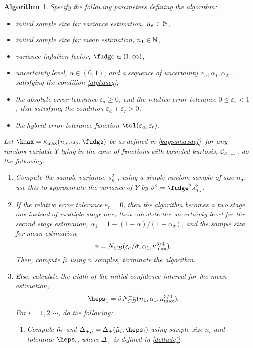 \documentclass{iitthesis}
\newtheorem{algorithm}[theorem]{Algorithm}
\begin{document}
\begin{algorithm}\label{meanMCg} 
Specify the following parameters defining the algorithm:
\begin{itemize}
\item initial sample size for variance estimation, $n_{\sigma} \in \mathbb{N}$,
\item initial sample size for mean estimation, $n_1 \in \mathbb{N}$,
\item variance inflation factor, $\fudge \in (1,\infty)$, 
\item uncertainty level, $\alpha\in (0,1)$, and a sequence of uncertainty $ \alpha_\sigma, \alpha_1,  \alpha_2, \ldots$ satisfying the condition \eqref{alphaseq}, 
\item the absolute error tolerance $\varepsilon_a \geq 0$, and the relative error tolerance $0 \leq \varepsilon_r <1$, that satisfying the condition $\varepsilon_a+\varepsilon_r >0$,
\item the hybrid error tolerance function $\tol(\varepsilon_a,\varepsilon_r)$.
\end{itemize} 
Let $\kmax=\kappa_{\max}(n_\sigma,\alpha_\sigma,\fudge)$ be as defined in \eqref{kappamaxdef}, for any random variable $Y$ lying in the cone of functions with bounded kurtosis, $\mathcal{C}_{\kappa_{\max}}$, do the following:
\begin{enumerate}
\item Compute the sample variance, $s^2_{n_{\sigma}}$, using a simple random sample of size $n_\sigma$, use this to approximate the variance of $Y$ by $\hsigma^2 = \fudge^2 s^2_{n_\sigma}$. 
\item If the relative error tolerance $\varepsilon_r=0$, then the algorithm becomes a two stage one instead of multiple stage one, then calculate the uncertainty level for the second stage estimation, $\alpha_1 = 1-(1-\alpha)/(1-\alpha_\sigma)$, and the sample size for mean estimation,
$$n = N_{CB}(\varepsilon_a/\hat{\sigma},\alpha_1,\kappa_{\max}^{3/4}).$$ Then, compute $\tilde{\mu}$ using $n$ samples, terminate the algorithm.
\item Else, calculate the width of the initial confidence interval for the mean estimation,
\begin{align}\label{eps1def}
\heps_1=\hsigma N_{CB}^{-1}(n_1,\alpha_1,\kappa_{\max}^{3/4}).
\end{align}
For $i = 1,2,\cdots$, do the following:
\begin{enumerate}
\item  \label{deltamu}Compute $\hat{\mu}_i$ and $\Delta_{+,i}=\Delta_{+}(\hmu_i,\heps_i)$ using sample size $n_i$ and tolerance $\heps_i$, where $\Delta_{+}$ is defined in \eqref{deltadef}.

\end{enumerate}
\end{enumerate}
\end{algorithm}
\end{document}
